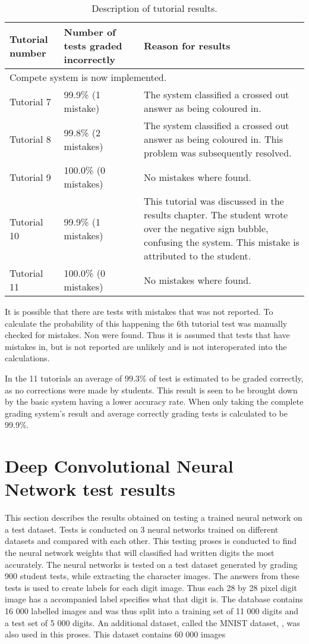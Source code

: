 \begin{table}
\caption{Description of tutorial results.} \label{tbl:tutResults2}
  \centering
\begin{tabular}{|p{2cm}|p{4cm}|p{5cm}|}
\hline
\textbf{Tutorial number}&\textbf{Number of tests graded incorrectly}&\textbf{Reason for results}\\
\hline
\multicolumn{3}{|l|}{Compete system is now implemented.}\\
\hline
Tutorial 7&99.9\% (1 mistake)&The system classified a crossed out answer as being coloured in.\\
\hline
Tutorial 8&99.8\% (2 mistakes)&The system classified a crossed out answer as being coloured in. This problem was subsequently resolved.\\
\hline
Tutorial 9&100.0\% (0 mistakes)&No mistakes where found.\\
\hline
Tutorial 10&99.9\% (1 mistakes)&This tutorial was discussed in the results chapter. The student wrote over the negative sign bubble, confusing the system. This mistake is attributed to the student.\\
\hline
Tutorial 11&100.0\% (0 mistakes)&No mistakes where found.\\
\hline
\end{tabular}
\end{table}

It is possible that there are tests with mistakes that was not reported. To calculate the probability of this happening the 6th tutorial test was manually checked for mistakes. Non were found. Thus it is assumed that tests that have mistakes in, but is not reported are unlikely and is not interoperated into the calculations.

In the 11 tutorials an average of 99.3\% of test is estimated to be graded correctly, as no corrections were made by students.  This result is seen to be brought down by the basic system having a lower accuracy rate. When only taking the complete grading system's result and average correctly grading tests is calculated to be 99.9\%.


\section{Deep Convolutional Neural Network test results}
\label{sec:DCNNresult}

This section describes the results obtained on testing a trained neural network on a test dataset. Tests is conducted on 3 neural networks trained on different datasets and compared with each other. This testing proses is conducted to find the neural network weights that will classified had written digits the most accurately. The neural networks is tested on a test dataset generated by grading 900 student tests, while extracting the character images. The answers from these tests is used to create labels for each digit image. Thus each 28 by 28 pixel digit image has a accompanied label specifies what that digit is. The database contains 16 000 labelled images and was thus split into a training set of 11 000 digits and a test set of 5 000 digits. An additional dataset, called the MNIST dataset, \citep{mnist}, was also used in this proses. This dataset contains 60 000 images 
